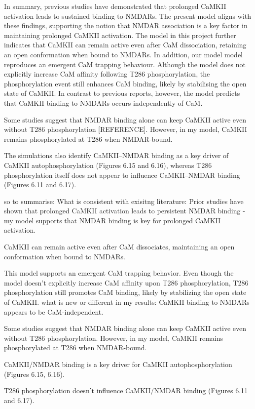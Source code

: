\documentclass[
  11pt,
  letterpaper,
]{scrreprt}
\begin{document}
In summary, previous studies have demonstrated that prolonged CaMKII
activation leads to sustained binding to NMDARs. The present model
aligns with these findings, supporting the notion that NMDAR association
is a key factor in maintaining prolonged CaMKII activation. The model in
this project further indicates that CaMKII can remain active even after
CaM dissociation, retaining an open conformation when bound to NMDARs.
In addition, our model model reproduces an emergent CaM trapping
behaviour. Although the model does not explicitly increase CaM affinity
following T286 phosphorylation, the phosphorylation event still enhances
CaM binding, likely by stabilising the open state of CaMKII. In contrast
to previous reports, however, the model predicts that CaMKII binding to
NMDARs occurs independently of CaM.

Some studies suggest that NMDAR binding alone can keep CaMKII active
even without T286 phosphorylation {[}REFERENCE{]}. However, in my model,
CaMKII remains phosphorylated at T286 when NMDAR-bound.

The simulations also identify CaMKII--NMDAR binding as a key driver of
CaMKII autophosphorylation (Figures 6.15 and 6.16), whereas T286
phosphorylation itself does not appear to influence CaMKII--NMDAR
binding (Figures 6.11 and 6.17).

so to summarise: What is consistent with exisitng literature: Prior
studies have shown that prolonged CaMKII activation leads to persistent
NMDAR binding - my model supports that NMDAR binding is key for
prolonged CaMKII activation.

CaMKII can remain active even after CaM dissociates, maintaining an open
conformation when bound to NMDARs.

This model supports an emergent CaM trapping behavior. Even though the
model doesn't explicitly increase CaM affinity upon T286
phosphorylation, T286 phosphorylation still promotes CaM binding, likely
by stabilizing the open state of CaMKII. what is new or different in my
results: CaMKII binding to NMDARs appears to be CaM-independent.

Some studies suggest that NMDAR binding alone can keep CaMKII active
even without T286 phosphorylation. However, in my model, CaMKII remains
phosphorylated at T286 when NMDAR-bound.

CaMKII/NMDAR binding is a key driver for CaMKII autophosphorylation
(Figures 6.15, 6.16).

T286 phosphorylation doesn't influence CaMKII/NMDAR binding (Figures
6.11 and 6.17).
\end{document}
